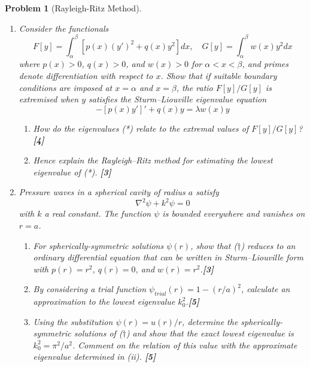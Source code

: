 \documentclass[a4paper]{article}
\theoremstyle{new}
\newtheorem{qns}{Problem}[section]
\begin{document}
\begin{qns}[Rayleigh-Ritz Method]\leavevmode
\begin{enumerate}[label=(\alph*)]
\item Consider the functionals
$$F[y]=\int_\alpha^\beta[p(x)(y')^2+q(x)y^2]dx,\quad G[y]=\int_\alpha^\beta w(x)y^2dx$$
where $p(x) > 0$, $q(x) > 0$, and $w(x) > 0$ for $\alpha < x < \beta$, and primes denote differentiation with respect to $x$. Show that if suitable boundary conditions are imposed at $x=\alpha$ and $x=\beta$, the ratio $F[y]/G[y]$ is extremised when $y$ satisfies the Sturm–Liouville eigenvalue equation
\begin{equation}
    -[p(x)y']'+q(x)y=\lambda w(x)y\tag{*}
\end{equation}
\begin{enumerate}[label=(\roman*)]
\item How do the eigenvalues (*) relate to the extremal values of $F[y]/G[y]$? \hfill \textbf{[4]}
\item Hence explain the Rayleigh–Ritz method for estimating the lowest eigenvalue of (*). \hfill \textbf{[3]}
\end{enumerate}
\item Pressure waves in a spherical cavity of radius $a$ satisfy
\begin{equation}
\nabla^2\psi+k^2\psi=0\tag{\dag} 
\end{equation}
with $k$ a real constant. The function $\psi$ is bounded everywhere and vanishes on $r = a$.
\begin{enumerate}[label=(\roman*)]
\item For spherically-symmetric solutions $\psi(r)$, show that ($\dag$) reduces to an ordinary differential equation that can be written in Sturm–Liouville form with $p(r) = r^2$, $q(r) = 0$, and $w(r) = r^2$.\hfill \textbf{[3]}
\item By considering a trial function  $\psi_{trial}(r) = 1−(r/a)^2$, calculate an approximation to the lowest eigenvalue $k_0^2$.\hfill \textbf{[5]}
\item Using the substitution $\psi(r) = u(r)/r$, determine the spherically-symmetric solutions of ($\dag$) and show that the exact lowest eigenvalue is $k_0^2=\pi^2/a^2$. Comment on the relation of this value with the approximate eigenvalue
determined in (ii). \hfill \textbf{[5]}
\end{enumerate}
\end{enumerate}
\end{qns}
\end{document}
